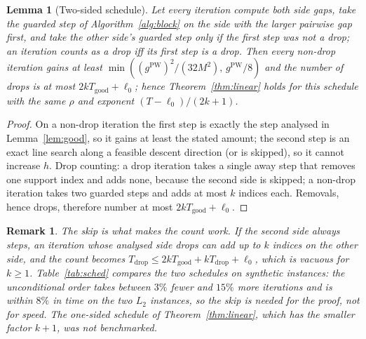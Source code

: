 \documentclass[pdflatex,sn-apa]{sn-jnl}%
\newtheorem{lemma}[theorem]{Lemma}
\newtheorem{remark}[theorem]{Remark}
\theoremstyle{thmstyleone}
\newtheorem{lemma}[theorem]{Lemma}
\theoremstyle{thmstyletwo}
\newtheorem{remark}[theorem]{Remark}
\newcommand{\gPW}{g^{\mathrm{PW}}}
\begin{document}
\begin{lemma}[Two-sided schedule]\label{lem:twosided}
Let every iteration compute both side gaps, take the guarded step of
Algorithm~\ref{alg:block} on the side with the larger pairwise gap
first, and take the other side's guarded step only if the first step
was not a drop; an iteration counts as a drop iff its first step is a
drop. Then every non-drop iteration gains at least
$\min((\gPW)^2/(32M^2),\,\gPW/8)$ and
the number of drops is at most $2kT_{\mathrm{good}}+\ell_0$; hence
Theorem~\ref{thm:linear} holds for this schedule with the same $\rho$
and exponent $(T-\ell_0)/(2k+1)$.
\end{lemma}
\begin{proof}
On a non-drop iteration the first step is exactly the step analysed in
Lemma~\ref{lem:good}, so it gains at least the stated amount; the
second step is an exact line search along a feasible descent direction
(or is skipped), so it cannot increase $h$. Drop counting: a drop
iteration takes a single away step that removes one support index and
adds none, because the second side is skipped; a non-drop iteration
takes two guarded steps and adds at most $k$ indices each. Removals,
hence drops, therefore number at most $2kT_{\mathrm{good}}+\ell_0$.
\end{proof}
\begin{remark}
The skip is what makes the count work. If the second side always
steps, an iteration whose analysed side drops can add up to $k$ indices
on the other side, and the count becomes
$T_{\mathrm{drop}}\le2kT_{\mathrm{good}}+kT_{\mathrm{drop}}+\ell_0$, which is
vacuous for $k\ge1$. Table~\ref{tab:sched} compares the two schedules on
synthetic instances: the unconditional order takes between $3\%$ fewer
and $15\%$ more iterations and is within $8\%$ in time on the two $L_2$
instances, so the skip is
needed for the proof, not for speed. The one-sided schedule of
Theorem~\ref{thm:linear}, which has the smaller factor $k+1$, was not
benchmarked.
\end{remark}
\end{document}
